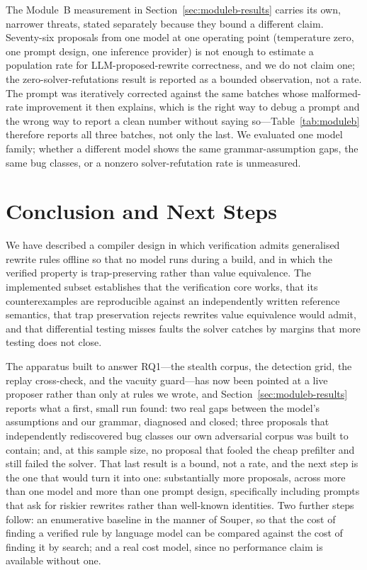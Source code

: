 \documentclass[conference]{IEEEtran}
\begin{document}
The Module~B measurement in Section~\ref{sec:moduleb-results} carries its own,
narrower threats, stated separately because they bound a different claim.
Seventy-six proposals from one model at one operating point (temperature
zero, one prompt design, one inference provider) is not enough to estimate a
population rate for LLM-proposed-rewrite correctness, and we do not claim
one; the zero-solver-refutations result is reported as a bounded observation,
not a rate. The prompt was iteratively corrected against the same batches
whose malformed-rate improvement it then explains, which is the right way to
debug a prompt and the wrong way to report a clean number without saying
so---Table~\ref{tab:moduleb} therefore reports all three batches, not only
the last. We evaluated one model family; whether a different model shows the
same grammar-assumption gaps, the same bug classes, or a nonzero
solver-refutation rate is unmeasured.

\section{Conclusion and Next Steps}

We have described a compiler design in which verification admits generalised
rewrite rules offline so that no model runs during a build, and in which the
verified property is trap-preserving rather than value equivalence. The
implemented subset establishes that the verification core works, that its
counterexamples are reproducible against an independently written reference
semantics, that trap preservation rejects rewrites value equivalence would
admit, and that differential testing misses faults the solver catches by
margins that more testing does not close.

The apparatus built to answer RQ1---the stealth corpus, the detection grid,
the replay cross-check, and the vacuity guard---has now been pointed at a
live proposer rather than only at rules we wrote, and Section~\ref{sec:moduleb-results}
reports what a first, small run found: two real gaps between the model's
assumptions and our grammar, diagnosed and closed; three proposals that
independently rediscovered bug classes our own adversarial corpus was built
to contain; and, at this sample size, no proposal that fooled the cheap
prefilter and still failed the solver. That last result is a bound, not a
rate, and the next step is the one that would turn it into one: substantially
more proposals, across more than one model and more than one prompt design,
specifically including prompts that ask for riskier rewrites rather than
well-known identities. Two further steps follow: an enumerative baseline in
the manner of Souper, so that the cost of finding a verified rule by language
model can be compared against the cost of finding it by search; and a real
cost model, since no performance claim is available without one.
\end{document}
